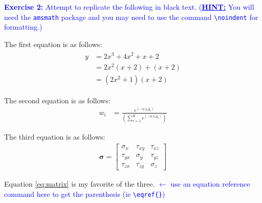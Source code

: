 \documentclass[]{article}
\newcommand{\BlueText}[1]{\textcolor{blue}{#1}}
\begin{document}
\noindent \BlueText{\textbf{Exercise 2:} Attempt to replicate the following in black text.
(\textbf{\underline{HINT:}} You will need the \texttt{amsmath} package and you may need to use the command \texttt{\textbackslash noindent} for formatting.)}
\vspace{1cm}

\noindent The first equation is as follows:
\begin{align}
\begin{split}
	y &= 2x^3 + 4x^2 + x + 2 \\
	&= 2x^2 (x+2) + (x+2) \\
	&= (2x^2+1) (x+2)
\end{split}
\end{align}


\noindent The second equation is as follows:
\begin{align}
	w_i &= \frac{e^{\left( -0.5\Delta_i \right) }}
	 {\left( \sum\limits_{r=1}^R e^{ \left( -0.5\Delta_i \right)} \right) }
\end{align}

\noindent The third equation is as follows:
\begin{align}
\label{eq:matrix}
	\boldsymbol{\sigma} = 
	\left[ \begin{matrix}
		\sigma_x & \tau_{xy} & \tau_{xz} \\
		\tau_{yx} & \sigma_y & \tau_{yz} \\
		\tau_{zx} & \tau_{zy} & \sigma_z
	\end{matrix} \right]
\end{align}

\noindent Equation \eqref{eq:matrix} is my favorite of the three.
\BlueText{$\leftarrow$ use an equation reference command here to get the parenthesis (ie \texttt{\textbackslash eqref\{\}})}
\end{document}
